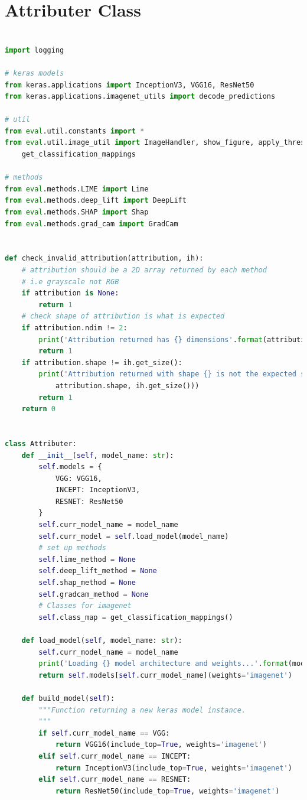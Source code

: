 \documentclass[main]{subfiles}
\begin{document}
\chapter{Attributer Class}

\begin{lstlisting}[language=Python,basicstyle=\scriptsize]

import logging

# keras models
from keras.applications import InceptionV3, VGG16, ResNet50
from keras.applications.imagenet_utils import decode_predictions

# util
from eval.util.constants import *
from eval.util.image_util import ImageHandler, show_figure, apply_threshold,
	get_classification_mappings

# methods
from eval.methods.LIME import Lime
from eval.methods.deep_lift import DeepLift
from eval.methods.SHAP import Shap
from eval.methods.grad_cam import GradCam


def check_invalid_attribution(attribution, ih):
    # attribution should be a 2D array returned by each method
    # i.e grayscale not RGB
    if attribution is None:
        return 1
    # check shape of attribution is what is expected
    if attribution.ndim != 2:
        print('Attribution returned has {} dimensions'.format(attribution.ndim))
        return 1
    if attribution.shape != ih.get_size():
        print('Attribution returned with shape {} is not the expected shape of {}'.format(
            attribution.shape, ih.get_size()))
        return 1
    return 0


class Attributer:
    def __init__(self, model_name: str):
        self.models = {
            VGG: VGG16,
            INCEPT: InceptionV3,
            RESNET: ResNet50
        }
        self.curr_model_name = model_name
        self.curr_model = self.load_model(model_name)
        # set up methods
        self.lime_method = None
        self.deep_lift_method = None
        self.shap_method = None
        self.gradcam_method = None
        # Classes for imagenet
        self.class_map = get_classification_mappings()

    def load_model(self, model_name: str):
        self.curr_model_name = model_name
        print('Loading {} model architecture and weights...'.format(model_name))
        return self.models[self.curr_model_name](weights='imagenet')

    def build_model(self):
        """Function returning a new keras model instance.
        """
        if self.curr_model_name == VGG:
            return VGG16(include_top=True, weights='imagenet')
        elif self.curr_model_name == INCEPT:
            return InceptionV3(include_top=True, weights='imagenet')
        elif self.curr_model_name == RESNET:
            return ResNet50(include_top=True, weights='imagenet')


\end{lstlisting}
\end{document}

